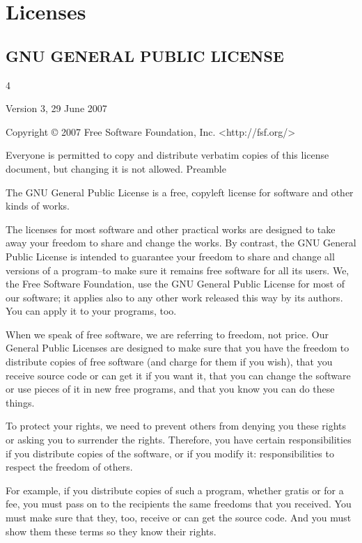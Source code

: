 \documentclass[fontsize=11pt,paper=A4,BCOR=12mm,DIV=13,open=any,listof=totoc,toc=flat]{scrbook}
\begin{document}
\chapter{Licenses}
\label{Licenses}
{\tiny
\section {GNU GENERAL PUBLIC LICENSE}
\begin{multicols}{4}

Version 3, 29 June 2007

Copyright © 2007 Free Software Foundation, Inc. <http://fsf.org/>

Everyone is permitted to copy and distribute verbatim copies of this license document, but changing it is not allowed.
Preamble

The GNU General Public License is a free, copyleft license for software and other kinds of works.

The licenses for most software and other practical works are designed to take away your freedom to share and change the works. By contrast, the GNU General Public License is intended to guarantee your freedom to share and change all versions of a program--to make sure it remains free software for all its users. We, the Free Software Foundation, use the GNU General Public License for most of our software; it applies also to any other work released this way by its authors. You can apply it to your programs, too.

When we speak of free software, we are referring to freedom, not price. Our General Public Licenses are designed to make sure that you have the freedom to distribute copies of free software (and charge for them if you wish), that you receive source code or can get it if you want it, that you can change the software or use pieces of it in new free programs, and that you know you can do these things.

To protect your rights, we need to prevent others from denying you these rights or asking you to surrender the rights. Therefore, you have certain responsibilities if you distribute copies of the software, or if you modify it: responsibilities to respect the freedom of others.

For example, if you distribute copies of such a program, whether gratis or for a fee, you must pass on to the recipients the same freedoms that you received. You must make sure that they, too, receive or can get the source code. And you must show them these terms so they know their rights.


\end{multicols}}
\end{document}
